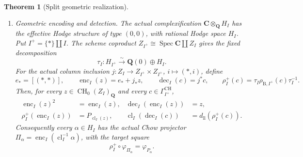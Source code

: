 \documentclass[11pt]{article}
\newtheorem{theorem}{Theorem}[section]
\theoremstyle{definition}
\theoremstyle{remark}
\DeclareMathOperator{\Spec}{Spec}
\DeclareMathOperator{\CH}{CH}
\newcommand{\Q}{\mathbf Q}
\begin{document}
\begin{theorem}[Split geometric realization]
\begin{enumerate}[label=\textup{(\roman*)},leftmargin=*]
\item \emph{Geometric encoding and detection.}
The actual complexification \(\mathbf C\otimes_{\Q}H_I\) has the
effective Hodge structure of type \((0,0)\), with rational Hodge space
\(H_I\).  Put \(I^+=\{*\}\amalg I\).  The scheme coproduct
\(Z_{I^+}\cong\Spec\mathbf C\amalg Z_I\) gives the fixed decomposition
\[
 \tau_I:H_{I^+}\xrightarrow{\sim}\Q(0)\oplus H_I.
\]
For the actual column inclusion
\(j:Z_I\to Z_{I^+}\times Z_{I^+}\), \(i\mapsto(*,i)\), define
\[
 e_*=[(*,*)],\qquad
 \operatorname{enc}_I(z)=e_*+j_*z,\qquad
 \operatorname{dec}_I(c)=j^*c,\qquad
 \rho_I^+(c)=\tau_I\rho_{\mathrm B,I^+}(c)\tau_I^{-1}.
\]
Then, for every \(z\in\CH_0(Z_I)_{\Q}\) and every
\(c\in\Gamma_{I^+}^{\mathrm{CH}}\),
\[
 \begin{aligned}
 \operatorname{enc}_I(z)^2&=\operatorname{enc}_I(z),&
 \operatorname{dec}_I(\operatorname{enc}_I(z))&=z,\\
 \rho_I^+(\operatorname{enc}_I(z))&=P_{\operatorname{cl}_I(z)},&
 \operatorname{cl}_I(\operatorname{dec}_I(c))
   &=d_{\mathrm{ll}}(\rho_I^+(c)).
 \end{aligned}
\]
Consequently every \(\alpha\in H_I\) has the actual Chow projector
\(\Pi_\alpha=\operatorname{enc}_I(\operatorname{cl}_I^{-1}\alpha)\),
with the target square
\[
 \rho_I^+\circ\varphi_{\Pi_\alpha}=\varphi_{P_\alpha}.
\]


\end{enumerate}
\end{theorem}
\end{document}
